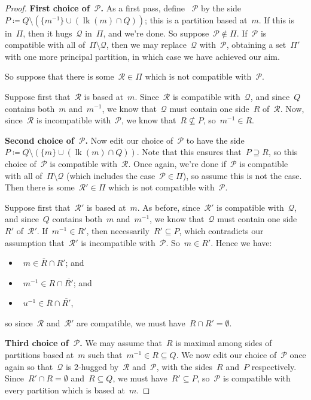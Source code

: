 \documentclass[11pt]{amsart}
\theoremstyle{definition}
\theoremstyle{definition}
\theoremstyle{definition}
\theoremstyle{definition}
\newcommand{\calQ}{\mathcal{Q}}
\newcommand{\calP}{\mathcal{P}} %
\newcommand{\calR}{\mathcal{R}} %
\newcommand{\link}[1]{\operatorname{lk}({#1})} %
\begin{document}
\begin{proof}
    \textbf{First choice of~$\calP$.} As a first pass, define ~$\calP$ by the side~$P \coloneqq Q \setminus \left(\{m^{-1}\} \cup (\link{m} \cap Q)\right)$; this is a partition based at~$m$. If this is in~$\Pi$, then it hugs~$\calQ$ in~$\Pi$, and we're done. So suppose~$\calP \notin \Pi$. If~$\calP$ is compatible with all of~$\Pi \setminus \calQ$, then we may replace~$\calQ$ with~$\calP$, obtaining a set~$\Pi'$ with one more principal partition, in which case we have achieved our aim. 

    So suppose that there is some~$\calR \in \Pi$ which is not compatible with~$\calP$.

    Suppose first that~$\calR$ is based at~$m$. Since~$\calR$ is compatible with~$\calQ$, and since~$Q$ contains both~$m$ and~$m^{-1}$, we know that~$\calQ$ must contain one side~$R$ of~$\calR$. Now, since~$\calR$ is incompatible with~$\calP$, we know that~$R \not\subseteq P$, so~$m^{-1} \in R$. 
    
    \textbf{Second choice of~$\calP$.} Now edit our choice of~$\calP$ to have the side~$P \coloneqq Q \setminus \left(\{m\} \cup (\link{m} \cap Q)\right)$. Note that this ensures that~$P \supseteq R$, so this choice of~$\calP$ is compatible with~$\calR$. Once again, we're done if~$\calP$ is compatible with all of~$\Pi \setminus \calQ$ (which includes the case~$\calP \in \Pi$), so assume this is not the case. Then there is some~$\calR' \in \Pi$ which is not compatible with~$\calP$.

    Suppose first that~$\calR'$ is based at~$m$. As before, since~$\calR'$ is compatible with~$\calQ$, and since~$Q$ contains both~$m$ and~$m^{-1}$, we know that~$\calQ$ must contain one side~$R'$ of~$\calR'$. If~$m^{-1} \in R'$, then necessarily~$R' \subseteq P$, which contradicts our assumption that~$\calR'$ is incompatible with~$\calP$. So~$m \in R'$. Hence we have:
    \begin{itemize}
        \item~$m \in \overline{R} \cap R'$; and
        \item~$m^{-1} \in R \cap \overline{R'}$; and
        \item~$u^{-1} \in \overline{R} \cap \overline{R'}$,
    \end{itemize}
    so since~$\calR$ and~$\calR'$ are compatible, we must have~$R \cap R' = \emptyset$.

    \textbf{Third choice of~$\calP$.} We may assume that~$R$ is maximal among sides of partitions based at~$m$ such that~$m^{-1} \in R \subseteq Q$. We now edit our choice of~$\calP$ once again so that~$\calQ$ is 2-hugged by~$\calR$ and~$\calP$, with the sides~$R$ and~$P$ respectively. Since~$R' \cap R = \emptyset$ and~$R \subseteq Q$, we must have~$R' \subseteq P$, so~$\calP$ is compatible with every partition which is based at~$m$. 


\end{proof}
\end{document}
